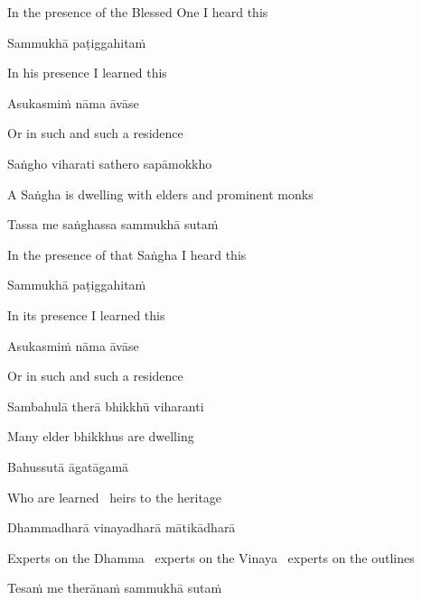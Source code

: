 \begin{english}
  In the presence of the Blessed One I heard this
\end{english}

Sammukhā paṭiggahitaṁ

\begin{english}
  In his presence I learned this
\end{english}

Asukasmiṁ nāma āvāse

\begin{english}
  Or in such and such a residence
\end{english}

Saṅgho viharati sathero sapāmokkho

\begin{english}
  A Saṅgha is dwelling with elders and prominent monks
\end{english}

Tassa me saṅghassa sammukhā sutaṁ

\begin{english}
  In the presence of that Saṅgha I heard this
\end{english}

Sammukhā paṭiggahitaṁ

\begin{english}
  In its presence I learned this
\end{english}

Asukasmiṁ nāma āvāse

\begin{english}
  Or in such and such a residence
\end{english}

Sambahulā therā bhikkhū viharanti

\begin{english}
  Many elder bhikkhus are dwelling
\end{english}

Bahussutā āgatāgamā

\begin{english}
  Who are learned \breathmark\ heirs to the heritage
\end{english}

Dhammadharā vinayadharā mātikādharā

\begin{english}
  Experts on the Dhamma \breathmark\ experts on the Vinaya \breathmark\ experts on the outlines
\end{english}

Tesaṁ me therānaṁ sammukhā sutaṁ

